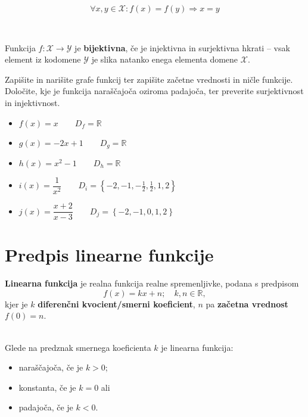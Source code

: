                 $$\forall x,y\in\mathcal{X}: f(x)=f(y)\Rightarrow x=y$$


                ~

            Funkcija $f:\mathcal{X}\to\mathcal{Y}$ je \textbf{bijektivna}, če je injektivna in surjektivna hkrati -- vsak element iz kodomene $\mathcal{Y}$ je slika natanko enega elementa domene $\mathcal{X}$.



            \begin{naloga}
                Zapišite in narišite grafe funkcij ter zapišite začetne vrednosti in ničle funkcije.
                Določite, kje je funkcija naraščajoča oziroma padajoča, ter preverite surjektivnost in injektivnost.
                    \begin{itemize}
                        \item $f(x)=x \quad \quad D_f=\mathbb{R}$ 
                        \item $g(x)=-2x+1 \quad \quad D_g=\mathbb{R}$ 
                        \item $h(x)=x^2-1 \quad \quad D_h=\mathbb{R}$ 
                        \item $i(x)=\dfrac{1}{x^2} \quad \quad D_i=\left\{-2, -1, -\frac{1}{2}, \frac{1}{2}, 1, 2\right\}$ 
                        \item $j(x)=\dfrac{x+2}{x-3} \quad \quad D_j=\left\{-2, -1, 0, 1, 2\right\}$ 
                    \end{itemize}
            \end{naloga}                    






\newpage


        \section{Predpis linearne funkcije}
        
                \textbf{Linearna funkcija} je realna funkcija realne spremenljivke, podana s predpisom 
                $$f(x)=kx+n;\quad k,n\in\mathbb{R},$$
                kjer je $k$ \textbf{diferenčni kvocient/smerni koeficient}, $n$ pa \textbf{začetna vrednost} $f(0)=n$.

                ~\\
                Glede na predznak smernega koeficienta $k$ je linearna funkcija:
                \begin{itemize}
                    \item naraščajoča, če je $k>0$;
                    \item konstanta, če je $k=0$ ali
                    \item padajoča, če je $k<0$.
                \end{itemize}

